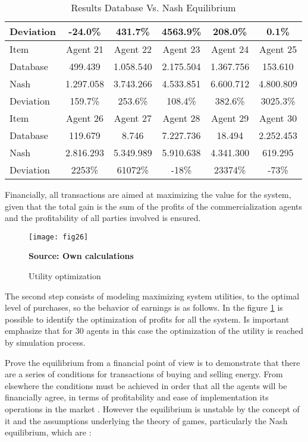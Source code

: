 \documentclass[12pt]{book}
\begin{document}
\begin{table}[htbp]
\begin{center}
\begin{tabular}{| l | c | c | c | c | c |}
Deviation & -24.0\% & 431.7\% & 4563.9\% & 208.0\% & 0.1\% \\ \hline
\hline
Item & Agent 21 & Agent 22 & Agent 23 & Agent 24 & Agent 25 \\ \hline
\hline \hline
Database & 499.439 & 1.058.540 & 2.175.504 & 1.367.756 & 153.610 \\ \hline
Nash & 1.297.058 & 3.743.266 & 4.533.851 & 6.600.712 & 4.800.809  \\ \hline
Deviation & 159.7\% & 253.6\% & 108.4\% & 382.6\% & 3025.3\% \\ \hline
\hline
Item & Agent 26 & Agent 27 & Agent 28 & Agent 29 & Agent 30 \\ \hline
\hline \hline
Database & 119.679 & 8.746 & 7.227.736 & 18.494 & 2.252.453 \\ \hline
Nash & 2.816.293 & 5.349.989 & 5.910.638 & 4.341.300 & 619.295  \\ \hline
Deviation & 2253\% & 61072\% & -18\% & 23374\% & -73\% \\ \hline
\end{tabular}
\caption{Results Database Vs. Nash Equilibrium}
\label{table1}
\end{center}
\end{table}

Financially, all transactions are aimed at maximizing the value for the system, given that the total gain is the sum of the profits of the commercialization agents and the profitability of all parties involved is ensured. 

\begin{figure}  
\centering    
\texttt{[image: fig26]}  
\caption{Utility optimization}
\scriptsize 
\textbf{Source: Own calculations}
\captionsetup{justification=centering,margin=1cm}   
\label{Fig 26}
\end{figure}

The second step consists of modeling maximizing system utilities, to the optimal level of purchases, so the behavior of earnings is as follows. In the figure \ref{Fig 26} is possible to identify the optimization of profits for all the system. Is important emphasize that for 30 agents in this case the optimization of the utility is reached by simulation process.

Prove the equilibrium from a financial point of view is to demonstrate that there are a series of conditions for transactions of buying and selling energy. From elsewhere the conditions must be achieved in order that all the agents will be financially agree, in terms of profitability and ease of implementation its operations in the market \cite{krause2006}. However the equilibrium is unstable by the concept of it and the assumptions underlying the theory of games, particularly the Nash equilibrium, which are \cite{von2009} \cite{axtell1999}: 
\end{document}
